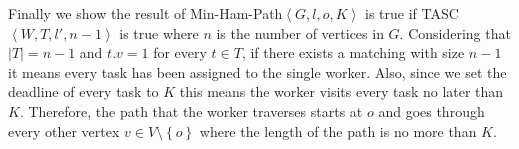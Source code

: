\begin{appendices}
Finally we show the result of Min-Ham-Path$\left\langle G, l, o, K \right\rangle$ is true if TASC$\left\langle W, T, l', n-1 \right\rangle$ is true where $n$ is the number of vertices in $G$. Considering that $\left\vert T \right\vert = n - 1$ and $t.v = 1$ for every $t \in T$, if there exists a matching with size $n - 1$ it means every task has been assigned to the single worker. Also, since we set the deadline of every task to $K$ this means the worker visits every task no later than $K$. Therefore, the path that the worker traverses starts at $o$ and goes through every other vertex $v \in V \setminus \left\{ o \right\}$ where the length of the path is no more than $K$.

\end{appendices}